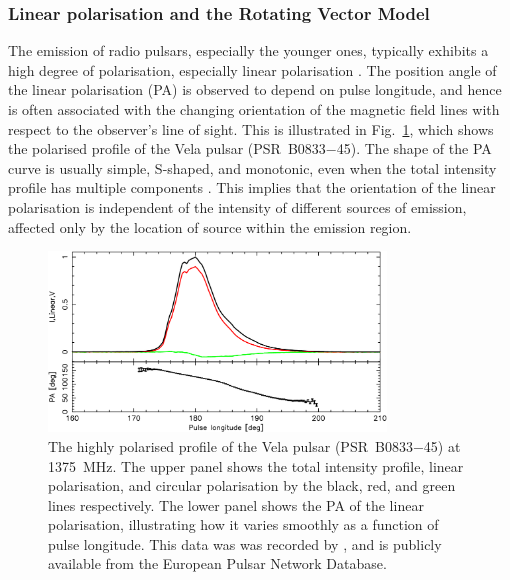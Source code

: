 \subsubsection*{Linear polarisation and the Rotating Vector Model}
\label{sec: intro - emission models - polarisation - RVM}

The emission of radio pulsars, especially the younger ones, typically exhibits a high degree of polarisation, especially linear polarisation \citep[e.g.][]{QMLG1995, CMKx2001}. The position angle of the linear polarisation (PA) is observed to depend on pulse longitude, and hence is often associated with the changing orientation of the magnetic field lines with respect to the observer's line of sight. This is illustrated in Fig.~\ref{fig: intro - vela polarisation}, which shows the polarised profile of the Vela pulsar (PSR~B0833$-$45). The shape of the PA curve is usually simple, S-shaped, and monotonic, even when the total intensity profile has multiple components \citep{WCL+1999}. This implies that the orientation of the linear polarisation is independent of the intensity of different sources of emission, affected only by the location of source within the emission region.
\begin{figure}
    \begin{center}
        \includegraphics[width=0.8\textwidth]{Figures/Introduction/vela.png}
        \caption[The polarisation properties of the Vela pulsar]{The highly polarised profile of the Vela pulsar (PSR~B0833$-$45) at 1375~MHz. The upper panel shows the total intensity profile, linear polarisation, and circular polarisation by the black, red, and green lines respectively. The lower panel shows the PA of the linear polarisation, illustrating how it varies smoothly as a function of pulse longitude. This data was was recorded by \citet{KJxx2006}, and is publicly available from the European Pulsar Network Database\footnotemark.}
        \label{fig: intro - vela polarisation}
    \end{center}
\end{figure}

